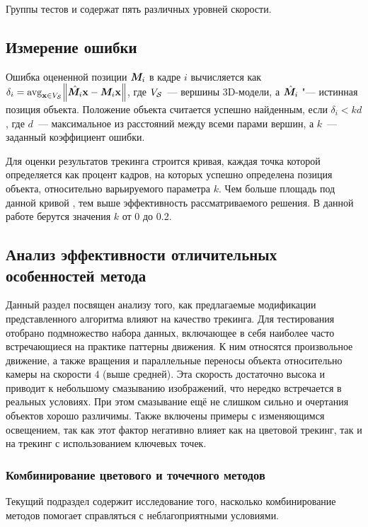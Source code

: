 Группы тестов  и  содержат пять различных
уровней скорости.

\subsection{Измерение ошибки}

Ошибка оцененной позиции $\bm{M}_i$ в кадре $i$ вычисляется как
$
\delta_i = \operatorname*{avg}_{\mathbf{x} \in V_{\mathcal{S}}} \norm{\hat{\bm{M}_i} \mathbf{x} - \bm{M}_i
\mathbf{x}}
$,
где $V_{\mathcal{S}}$~--- вершины 3D-модели,
а $\hat{\bm{M}_i}$ "--- истинная позиция объекта.
Положение объекта считается успешно найденным, если $\delta_i < k d$, где
$d$~--- максимальное из расстояний между всеми парами вершин, а $k$~---
заданный коэффициент ошибки.

Для оценки результатов трекинга строится кривая, каждая точка которой
определяется как процент кадров, на которых успешно определена позиция
объекта, относительно варьируемого параметра $k$.
Чем больше площадь под данной кривой , тем выше эффективность
рассматриваемого решения.
В данной работе берутся значения $k$ от 0 до 0.2.

\subsection{Анализ эффективности отличительных особенностей метода}

Данный раздел посвящен анализу того, как предлагаемые модификации
представленного алгоритма влияют на качество трекинга.
Для тестирования отобрано подмножество набора данных, включающее в себя
наиболее часто встречающиеся на практике паттерны движения.
К ним относятся произвольное движение, а также вращения и параллельные переносы
объекта относительно камеры на скорости $4$ (выше средней).
Эта скорость достаточно высока и приводит к небольшому смазыванию изображений,
что нередко встречается в реальных условиях.
При этом смазывание ещё не слишком сильно и очертания объектов хорошо
различимы.
Также включены примеры с изменяющимся освещением, так как этот фактор негативно
влияет как на цветовой трекинг, так и на трекинг с использованием ключевых
точек.

\subsubsection{Комбинирование цветового и точечного методов}

Текущий подраздел содержит исследование того, насколько комбинирование методов
помогает справляться с неблагоприятными условиями.

